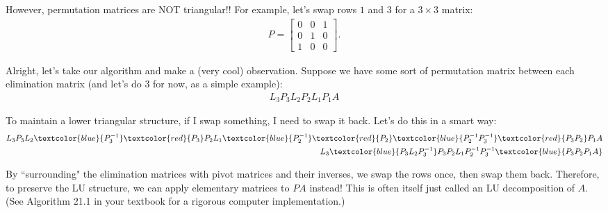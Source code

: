 \documentclass{ximera}
\begin{document}
However, permutation matrices are NOT triangular!!  For example, let's swap rows $1$ and $3$ for a $3\times 3$ matrix:
\begin{align}
    P = \begin{bmatrix}
        0 & 0 & 1 \\ 0 & 1 & 0 \\ 1 & 0 & 0
    \end{bmatrix}.
\end{align}

Alright, let's take our algorithm and make a (very cool) observation.  Suppose we have some sort of permutation matrix between each elimination matrix (and let's do 3 for now, as a simple example):
\begin{align*}
    L_3P_3L_2P_2L_1P_1A
\end{align*}

To maintain a lower triangular structure, if I swap something, I need to swap it back.  Let's do this in a smart way:
\begin{align*}
    L_3P_3L_2\textcolor{blue}{P_3^{-1}}\textcolor{red}{P_3}P_2L_1\textcolor{blue}{P_2^{-1}}\textcolor{red}{P_2}\textcolor{blue}{P_2^{-1}P_3^{-1}}\textcolor{red}{P_3P_2}P_1A
    \\
    L_3 \textcolor{blue}{P_3L_2P_3^{-1}} P_3P_2L_1P_2^{-1}P_3^{-1}\textcolor{blue}{P_3P_2P_1A}
\end{align*}

By ``surrounding" the elimination matrices with pivot matrices and their inverses, we swap the rows once, then swap them back. 
Therefore, to preserve the LU structure, we can apply elementary matrices to $PA$ instead!  This is often itself just called an LU decomposition of $A$.  (See Algorithm 21.1 in your textbook for a rigorous computer implementation.)
\end{document}
